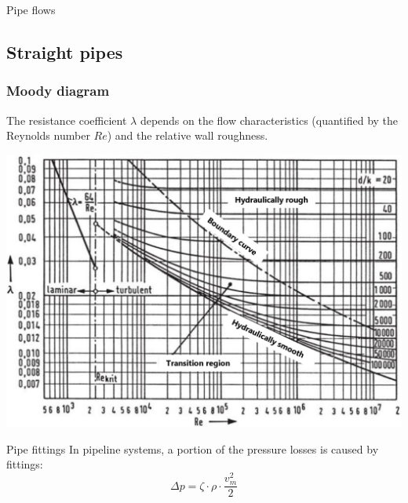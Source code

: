 \documentclass{article}
\begin{document}
\begin{multicols}{2}
\begin{theorybox}{Pipe flows}
\end{theorybox}

\vfill
\columnbreak

\subsection{Straight pipes}
\subsubsection{Moody diagram}
The resistance coefficient $\lambda$ depends on the flow characteristics
(quantified by the Reynolds number $Re$) and the relative wall roughness.

\includegraphics[width=\columnwidth]{media/Moody-Diagramm_en.png}

\begin{theorybox}{Pipe fittings}
    In pipeline systems, a portion of the pressure losses is caused by fittings:
    \begin{equation}
        \Delta p = \zeta \cdot \rho \cdot \frac{v_m^2}{2}
    \end{equation}


\end{theorybox}
\end{multicols}
\end{document}
